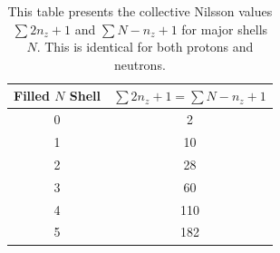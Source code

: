 \documentclass[10pt,a4paper, twoside, openright]{report}
\begin{document}
\begin{table} 
\centering
\caption[Collective Nilsson for for major shells.]{This table presents the collective Nilsson values $\sum 2n_z + 1$ and $\sum N - n_z + 1$ for major shells $N$. This is identical for both protons and neutrons. \label{table:FullShellNz}}
\begin{tabular}{c|c}
\toprule
\toprule
Filled $N$ Shell & $\sum 2n_z + 1 = \sum N - n_z + 1$ \\ [2pt]
\midrule
0 & 2\\
1 & 10\\
2 & 28\\
3 & 60\\
4 & 110\\
5 & 182 \\
\bottomrule
\bottomrule
\end{tabular}
\end{table}
\end{document}
